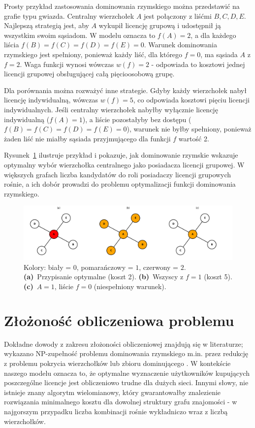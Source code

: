 Prosty przykład zastosowania dominowania rzymskiego można przedstawić na grafie typu gwiazda. Centralny wierzchołek $A$ jest połączony z liśćmi $B, C, D, E$. Najlepszą strategią jest, aby $A$ wykupił licencję grupową i udostępnił ją wszystkim swoim sąsiadom. W modelu oznacza to $f(A)=2$, a dla każdego liścia $f(B)=f(C)=f(D)=f(E)=0$. Warunek dominowania rzymskiego jest spełniony, ponieważ każdy liść, dla którego $f=0$, ma sąsiada $A$ z $f=2$. Waga funkcji wynosi wówczas $w(f)=2$ - odpowiada to kosztowi jednej licencji grupowej obsługującej całą pięcioosobową grupę.

Dla porównania można rozważyć inne strategie. Gdyby każdy wierzchołek nabył licencję indywidualną, wówczas $w(f)=5$, co odpowiada kosztowi pięciu licencji indywidualnych. Jeśli centralny wierzchołek nabyłby wyłącznie licencję indywidualną ($f(A)=1$), a liście pozostałyby bez dostępu ($f(B)=f(C)=f(D)=f(E)=0$), warunek nie byłby spełniony, ponieważ żaden liść nie miałby sąsiada przyjmującego dla funkcji $f$ wartość 2.

Rysunek~\ref{fig:romandomatinonstarexamepl} ilustruje przykład i pokazuje, jak dominowanie rzymskie wskazuje optymalny wybór wierzchołka centralnego jako posiadacza licencji grupowej. W większych grafach liczba kandydatów do roli posiadaczy licencji grupowych rośnie, a ich dobór prowadzi do problemu optymalizacji funkcji dominowania rzymskiego.


\begin{figure}[H]
  \centering
  \includegraphics[width=1\textwidth]{assets/stars.png}
  \caption{
    Kolory: biały = $0$, pomarańczowy = $1$, czerwony = $2$.
    \textbf{(a)}~Przypisanie optymalne (koszt 2).
    \textbf{(b)}~Wszyscy z $f=1$ (koszt 5).
    \textbf{(c)}~$A=1$, liście $f=0$ (niespełniony warunek).
  }
  \label{fig:romandomatinonstarexamepl}
\end{figure}


\section{Złożoność obliczeniowa problemu}

Dokładne dowody z zakresu złożoności obliczeniowej znajdują się w literaturze; wykazano NP-zupełność problemu dominowania rzymskiego m.in. przez redukcję z problemu pokrycia wierzchołków lub zbioru dominującego \cite{chambers2009}. W kontekście naszego modelu oznacza to, że optymalne wyznaczenie użytkowników kupujących poszczególne licencje jest obliczeniowo trudne dla dużych sieci. Innymi słowy, nie istnieje znany algorytm wielomianowy, który gwarantowałby znalezienie rozwiązania minimalnego kosztu dla dowolnej struktury grafu znajomości - w najgorszym przypadku liczba kombinacji rośnie wykładniczo wraz z liczbą wierzchołków.

